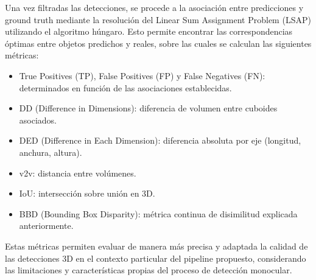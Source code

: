 Una vez filtradas las detecciones, se procede a la asociación entre predicciones y ground truth mediante la resolución del Linear Sum Assignment Problem (LSAP) utilizando el algoritmo húngaro. Esto permite encontrar las correspondencias óptimas entre objetos predichos y reales, sobre las cuales se calculan las siguientes métricas:

\begin{itemize}
    
    \item True Positives (TP), False Positives (FP) y False Negatives (FN): determinados en función de las asociaciones establecidas.
    
    \item DD (Difference in Dimensions): diferencia de volumen entre cuboides asociados.

    \item DED (Difference in Each Dimension): diferencia absoluta por eje (longitud, anchura, altura).
    
    \item v2v: distancia entre volúmenes.

    \item IoU: intersección sobre unión en 3D.
    
    \item BBD (Bounding Box Disparity): métrica continua de disimilitud explicada anteriormente.
\end{itemize}
    
Estas métricas permiten evaluar de manera más precisa y adaptada la calidad de las detecciones 3D en el contexto particular del pipeline propuesto, considerando las limitaciones y características propias del proceso de detección monocular.

